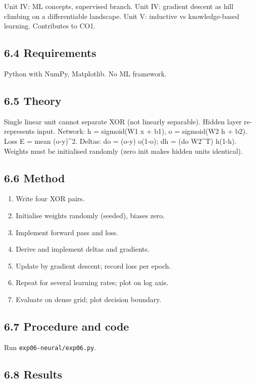 \documentclass[
]{article}
\providecommand{\tightlist}{%
  \setlength{\itemsep}{0pt}\setlength{\parskip}{0pt}}
\begin{document}
Unit IV: ML concepts, supervised branch. Unit IV: gradient descent as
hill climbing on a differentiable landscape. Unit V: inductive vs
knowledge-based learning. Contributes to CO1.

\subsection{6.4 Requirements}\label{requirements-5}

Python with NumPy, Matplotlib. No ML framework.

\subsection{6.5 Theory}\label{theory-5}

Single linear unit cannot separate XOR (not linearly separable). Hidden
layer re-represents input. Network: h = sigmoid(W1 x + b1), o =
sigmoid(W2 h + b2). Loss E = mean (o-y)\^{}2. Deltas: do = (o-y) o(1-o);
dh = (do W2\^{}T) h(1-h). Weights must be initialised randomly (zero
init makes hidden units identical).

\subsection{6.6 Method}\label{method-5}

\begin{enumerate}
\def\labelenumi{\arabic{enumi}.}
\tightlist
\item
  Write four XOR pairs.
\item
  Initialise weights randomly (seeded), biases zero.
\item
  Implement forward pass and loss.
\item
  Derive and implement deltas and gradients.
\item
  Update by gradient descent; record loss per epoch.
\item
  Repeat for several learning rates; plot on log axis.
\item
  Evaluate on dense grid; plot decision boundary.
\end{enumerate}

\subsection{6.7 Procedure and code}\label{procedure-and-code-5}

Run \texttt{exp06-neural/exp06.py}.

\subsection{6.8 Results}\label{results-5}
\end{document}
